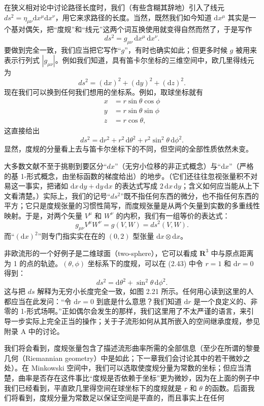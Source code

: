 在狭义相对论中讨论路径长度时，我们（有些含糊其辞地）引入了线元 $ds^2=\eta_{\mu\nu}\mathrm{d}x^\mu\mathrm{d}x^\nu$，用它来求路径的长度。当然，既然我们如今知道 $\mathrm{d}x^\mu$ 其实是一个基对偶矢，把“度规”和“线元”这两个词互换使用就变得自然而然了，于是写作
\begin{equation*}
ds^2=g_{\mu\nu}\,\mathrm{d}x^\mu\,\mathrm{d}x^\nu. \tag{2.40}
\end{equation*}
要做到完全一致，我们应当把它写作“$g$”，有时也确实如此；但更多时候 $g$ 被用来表示行列式 $|g_{\mu\nu}|$。例如我们知道，具有笛卡尔坐标的三维空间中，欧几里得线元为
\begin{equation*}
ds^2=(\mathrm{d}x)^2+(\mathrm{d}y)^2+(\mathrm{d}z)^2. \tag{2.41}
\end{equation*}
现在我们可以换到任何我们想用的坐标系。例如，取球坐标就有
\begin{align*}
x&=r\sin\theta\cos\phi\\
y&=r\sin\theta\sin\phi\\
z&=r\cos\theta, \tag{2.42}
\end{align*}
这直接给出
\begin{equation*}
ds^2=\mathrm{d}r^2+r^2\,\mathrm{d}\theta^2+r^2\sin^2\theta\,\mathrm{d}\phi^2. \tag{2.43}
\end{equation*}
显然，度规的分量看上去与笛卡尔坐标下的不同，但空间的全部性质依然未变。

大多数文献不至于挑剔到要区分“$dx$”（无穷小位移的非正式概念）与“$\mathrm{d}x$”（严格的基 1-形式概念，由坐标函数的梯度给出）的地步。（它们还往往忽视张量积不对易这一事实，把诸如 $\mathrm{d}x\,\mathrm{d}y+\mathrm{d}y\,\mathrm{d}x$ 的表达式写成 $2\,\mathrm{d}x\,\mathrm{d}y$；含义如何应当能从上下文看清楚。）实际上，我们的记号“$ds^2$”既不指任何东西的微分，也不指任何东西的平方；它只是度规张量的习惯性简写，而度规张量是从两个矢量到实数的多重线性映射。于是，对两个矢量 $V^\mu$ 和 $W^\nu$ 的内积，我们有一组等价的表达式：
\begin{equation*}
g_{\mu\nu}V^\mu W^\nu=g(V,W)=ds^2(V,W). \tag{2.44}
\end{equation*}
而“$(\mathrm{d}x)^2$”则专门指实实在在的 $(0,2)$ 型张量 $\mathrm{d}x\otimes\mathrm{d}x$。

非欧流形的一个好例子是二维球面（two-sphere），它可以看成 $\mathbf{R}^3$ 中与原点距离为 1 的点的轨迹。$(\theta,\phi)$ 坐标系下的度规，可以在 (2.43) 中令 $r=1$ 和 $\mathrm{d}r=0$ 得到：
\begin{equation*}
ds^2=\mathrm{d}\theta^2+\sin^2\theta\,\mathrm{d}\phi^2. \tag{2.45}
\end{equation*}
这与把 $ds$ 解释为无穷小长度完全一致，如图 2.21 所示。任何用心读到这里的人都应当在此发问：“令 $\mathrm{d}r=0$ 到底是什么意思？我们知道 $\mathrm{d}r$ 是一个良定义的、非零的 1-形式场啊。”正如偶尔会发生的那样，我们这里用了不太严谨的语言，来引导一步实际上完全正当的操作；关于子流形如何从其所嵌入的空间继承度规，参见附录 A 中的讨论。

我们将会看到，度规张量包含了描述流形曲率所需的全部信息（至少在所谓的黎曼几何（Riemannian geometry）中是如此；下一章我们会讨论其中的若干微妙之处）。在 Minkowski 空间中，我们可以选取使度规分量为常数的坐标；但应当清楚，曲率是否存在这件事比“度规是否依赖于坐标”更为微妙，因为在上面的例子中我们已经看到，平直欧几里得空间在球坐标下的度规就是 $r$ 和 $\theta$ 的函数。后面我们将看到，度规分量为常数足以保证空间是平直的，而且事实上在任何
